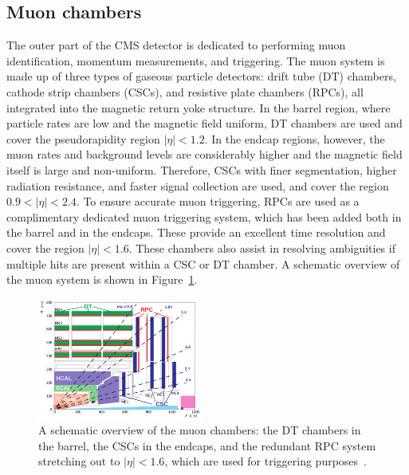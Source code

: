 \subsection{Muon chambers}
The outer part of the CMS detector is dedicated to performing muon identification, momentum measurements, and triggering.
The muon system is made up of three types of gaseous particle detectors: drift tube (DT) chambers, cathode strip chambers (CSCs), and resistive plate chambers (RPCs), all integrated into the magnetic return yoke structure.
In the barrel region, where particle rates are low and the magnetic field uniform, DT chambers are used and cover the pseudorapidity region $|\eta|< 1.2$. In the endcap regions, however, the muon rates and background levels are considerably higher and the magnetic field itself is large and non-uniform. Therefore, CSCs with finer segmentation, higher radiation resistance, and faster signal collection are used, and cover the region $0.9 < |\eta|< 2.4$.
To ensure accurate muon triggering, RPCs are used as a complimentary dedicated muon triggering system, which has been added both in the barrel and in the endcaps. These provide an excellent time resolution and cover the region $|\eta|< 1.6$. These chambers also assist in resolving ambiguities if multiple hits are present within a CSC or DT chamber. A schematic overview of the muon system is shown in Figure~\ref{fig:cms:muon-sys}.
\begin{figure}[h] 
    \centering
    \includegraphics[width=0.49\textwidth]{figures/cms/MuonSys.png}
    \caption{A schematic overview of the muon chambers: the DT chambers in the barrel, the CSCs in the endcaps, and the redundant RPC system stretching out to $|\eta|< 1.6$, which are used for triggering purposes~\cite{Kim:1477844}.}
    \label{fig:cms:muon-sys}
\end{figure}

